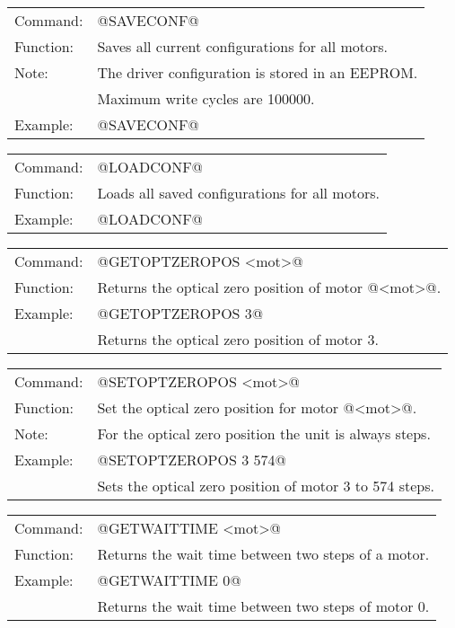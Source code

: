 \vspace{\vdistace}

\begin{tabular}{ll}
Command: & @SAVECONF@\\
Function: & Saves all current configurations for all motors.\\
Note: & The driver configuration is stored in an EEPROM.\\
		& Maximum write cycles are 100000.\\
Example: & @SAVECONF@
\end{tabular}

\vspace{\vdistace}

\begin{tabular}{ll}
Command: & @LOADCONF@\\
Function: & Loads all saved configurations for all motors.\\
Example: & @LOADCONF@\\
\end{tabular}

\vspace{\vdistace}

\begin{tabular}{ll}
Command: & @GETOPTZEROPOS <mot>@\\
Function: & Returns the optical zero position of motor @<mot>@.\\
Example: & @GETOPTZEROPOS 3@\\
		& Returns the optical zero position of motor 3.
\end{tabular}

\vspace{\vdistace}

\begin{tabular}{ll}
Command: & @SETOPTZEROPOS <mot>@\\
Function: & Set the optical zero position for motor @<mot>@.\\
Note: & For the optical zero position the unit is always steps.\\
Example: & @SETOPTZEROPOS 3 574@\\
		& Sets the optical zero position of motor 3 to 574 steps.
\end{tabular}

\vspace{\vdistace}

\begin{tabular}{ll}
Command: & @GETWAITTIME <mot>@\\
Function: & Returns the wait time between two steps of a motor.\\
Example: & @GETWAITTIME 0@\\
		& Returns the wait time between two steps of motor 0.
\end{tabular}

